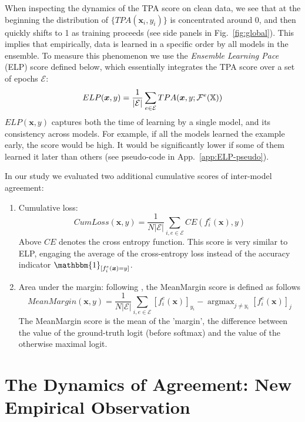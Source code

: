 \documentclass{article}
\DeclareMathOperator*{\argmax}{argmax}
\newcommand{\bx}{\bm{x}}
\newcommand{\F}{\mathcal{F}}
\newcommand{\Ec}{\mathcal{E}}
\newcommand{\iX}{\mathbb{X}}
\begin{document}
When inspecting the dynamics of the TPA score on clean data, we see that at the beginning the distribution of $\{TPA(\bx_i,y_i)\}$ is concentrated around 0, and then quickly shifts to 1 as training proceeds (see side panels in Fig.~\ref{fig:global}). This implies that empirically, data is learned in a specific order by all models in the ensemble. To measure this phenomenon we use the \textit{Ensemble Learning Pace} (ELP) score defined below, which essentially integrates the TPA score over a set of epochs $\Ec$:
\begin{eqnarray}
\label{eq:ELP}
ELP(\bx,y) = \frac{1}{\vert\Ec\vert}\sum_{e\in\Ec}TPA(\bx,y;\F^e(\iX))
\vspace{-1.0em}
\end{eqnarray}
$ELP(\bx,y)$ captures both the time of learning by a single model, and its consistency across models. For example, if all the models learned the example early, the score would be high. It would be significantly lower if some of them learned it later than others (see pseudo-code in App.~\ref{app:ELP-pseudo}).

In our study we evaluated two additional cumulative scores of inter-model agreement:
\begin{enumerate}[leftmargin=0.65cm]
    \item Cumulative loss:
\vspace{-1em}
\begin{equation*}
CumLoss(\bx,y) = \frac{1}{N\vert\Ec\vert}\sum_{i,{e\in\Ec}}CE(f_{i}^{e}(\bx),y)   
\end{equation*}
Above $CE$ denotes the cross entropy function. This score is very similar to ELP, engaging the average of the cross-entropy loss instead of the accuracy indicator $\mathbbm{1}_{[f_{i}^{e}(\bx) = y]}$.%
\item Area under the margin:
following \citep{pleiss2020identifying}, the MeanMargin score is defined as follows
\begin{equation*}
MeanMargin(\bx,y)=\frac{1}{N\vert\Ec\vert}\sum_{i,{e\in\Ec}}[f^{e}_{i}(\bx)]_{y_i}-\argmax_{j\neq y_{i}}[f^{e}_{i}(\bx)]_j    
\end{equation*}
The MeanMargin score is the mean of the 'margin', the difference between the value of the ground-truth logit (before softmax) and the value of the otherwise maximal logit.
\end{enumerate}


\section{The Dynamics of Agreement: New Empirical Observation}
\label{sec:agg-overfit}
\end{document}
